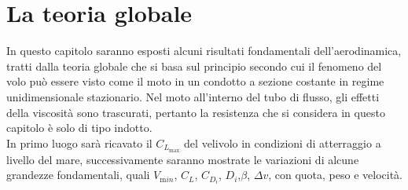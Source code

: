 
\chapter{La teoria globale}
In questo capitolo saranno esposti alcuni risultati fondamentali dell'aerodinamica, tratti dalla teoria globale che si basa sul principio secondo cui il fenomeno del volo può essere visto come il moto in un condotto a sezione costante in regime unidimensionale stazionario. Nel moto all'interno del tubo di flusso, gli effetti della viscosità sono trascurati, pertanto la resistenza che si considera in questo capitolo è solo di tipo indotto.\\ In primo luogo sarà ricavato il $C_{L_{\mathrm{max}}}$ del velivolo in condizioni di atterraggio a livello del mare, successivamente saranno mostrate le variazioni di alcune grandezze fondamentali, quali $V_{\mathrm min}$, $C_L$, $C_{D_i}$, $D_i$,$\beta$, $\varDelta v$, con quota, peso e velocità. 